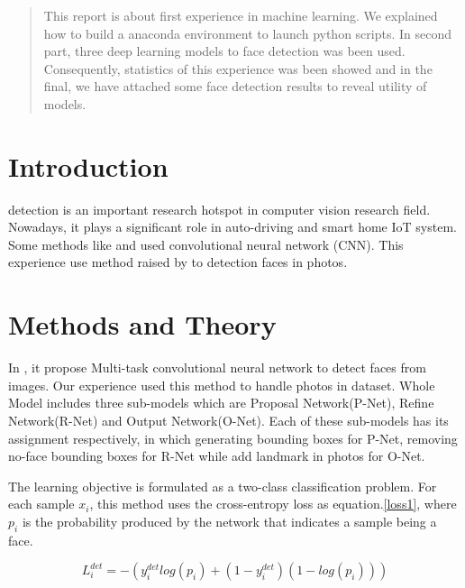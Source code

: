 \documentclass[journal, a4paper]{IEEEtran}
\begin{document}
\begin{abstract}
This report is about first experience in machine learning. We explained how to build a anaconda environment to launch python scripts. In second part, three deep learning models to face detection was been used. Consequently, statistics of this experience was been showed and in the final, we have attached some face detection results to reveal utility of models.
\end{abstract}

\section{Introduction}
 detection is an important research hotspot in computer vision research field. Nowadays, it plays a significant role in auto-driving and smart home IoT system. Some methods like \cite{ZHAN201619} and \cite{8080244} used convolutional neural network (CNN). This experience use method raised by \cite{7553523} to detection faces in photos.

\section{Methods and Theory}
In \cite{8080244}, it propose Multi-task convolutional neural network to detect faces from images. Our experience used this method to handle photos in dataset. Whole Model includes three sub-models which are Proposal Network(P-Net), Refine Network(R-Net) and Output Network(O-Net). Each of these sub-models has its assignment respectively, in which generating bounding boxes for P-Net, removing no-face bounding boxes for R-Net while add landmark in photos for O-Net.

The learning objective is formulated as a two-class classification problem. For each sample $x_{i}$, this method uses the cross-entropy loss as equation.\ref{loss1}, where $p_{i}$ is the probability produced by the network that indicates a sample being a face.



\begin{equation}
    L_{i}^{det}=-(y_{i}^{det}log(p_{i})+(1-y_{i}^{det})(1-log(p_{i})) )\label{loss1}
\end{equation}
\end{document}
